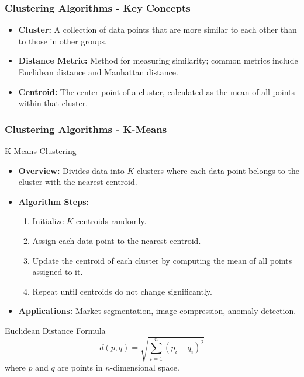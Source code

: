 \documentclass[aspectratio=169]{beamer}
\begin{document}
\begin{frame}[fragile]
    \frametitle{Clustering Algorithms - Key Concepts}
    \begin{itemize}
        \item \textbf{Cluster:} A collection of data points that are more similar to each other than to those in other groups.
        \item \textbf{Distance Metric:} Method for measuring similarity; common metrics include Euclidean distance and Manhattan distance.
        \item \textbf{Centroid:} The center point of a cluster, calculated as the mean of all points within that cluster.
    \end{itemize}
\end{frame}

\begin{frame}[fragile]
    \frametitle{Clustering Algorithms - K-Means}
    \begin{block}{K-Means Clustering}
        \begin{itemize}
            \item \textbf{Overview:} Divides data into \(K\) clusters where each data point belongs to the cluster with the nearest centroid.
            \item \textbf{Algorithm Steps:}
            \begin{enumerate}
                \item Initialize \(K\) centroids randomly.
                \item Assign each data point to the nearest centroid.
                \item Update the centroid of each cluster by computing the mean of all points assigned to it.
                \item Repeat until centroids do not change significantly.
            \end{enumerate}
            \item \textbf{Applications:} Market segmentation, image compression, anomaly detection.
        \end{itemize}
    \end{block}
    \begin{block}{Euclidean Distance Formula}
        \begin{equation}
            d(p, q) = \sqrt{\sum_{i=1}^{n} (p_i - q_i)^2}
        \end{equation}
        where \(p\) and \(q\) are points in \(n\)-dimensional space.
    \end{block}
\end{frame}
\end{document}
